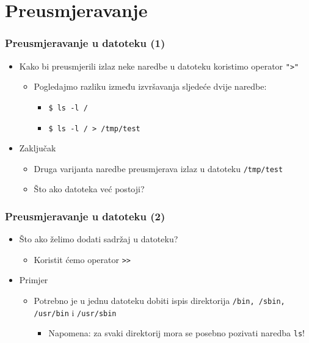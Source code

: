 \documentclass{beamer}
\newcommand{\shell}[1]{\texttt{#1}}
\begin{document}
\section{Preusmjeravanje}
\begin{frame}[t]
\frametitle{Preusmjeravanje u datoteku (1)}
\begin{itemize}
  \item Kako bi preusmjerili izlaz neke naredbe u datoteku koristimo
        operator \shell{">"}
  \begin{itemize}
    \item Pogledajmo razliku između izvršavanja sljedeće dvije naredbe:
    \begin{itemize}
      \item[] \shell{\$ ls -l /}
      \item[] \shell{\$ ls -l / > /tmp/test}
    \end{itemize}
  \end{itemize}
  \item Zaključak
  \begin{itemize}
    \item Druga varijanta naredbe preusmjerava izlaz u datoteku
          \shell{/tmp/test}
    \item Što ako datoteka već postoji?
  \end{itemize}
\end{itemize}
\end{frame}

\begin{frame}[t]
\frametitle{Preusmjeravanje u datoteku (2)}
\begin{itemize}
  \item Što ako želimo dodati sadržaj u datoteku?
  \begin{itemize}
    \item Koristit ćemo operator \shell{>>}
  \end{itemize}
  \item Primjer
  \begin{itemize}
    \item Potrebno je u jednu datoteku dobiti ispis direktorija
          \shell{/bin, /sbin, /usr/bin} i \shell{/usr/sbin}
    \begin{itemize}
      \item Napomena: za svaki direktorij mora se posebno pozivati
              naredba \shell{ls}!
    \end{itemize}
  \end{itemize}
\end{itemize}
\end{frame}
\end{document}
